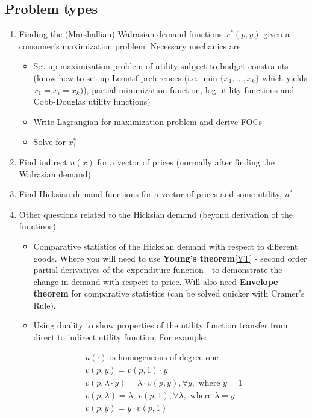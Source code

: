 \documentclass{article}
\begin{document}
\subsection{Problem types}
\begin{enumerate}
    \item Finding the (Marshallian) Walrasian demand functions $x^*(p,y)$ given a consumer's maximization problem. Necessary mechanics are: 
    \begin{itemize}
        \item Set up maximization problem of utility subject to budget constraints (know how to set up Leontif preferences (i.e. $\min \{ x_1, \ldots, x_k \}$ which yields $x_{1} = x_{i} = x_{k}$)), partial minimization function, log utility functions and Cobb-Douglas utility functions)
        \item Write Lagrangian for maximization problem and derive FOCs
        \item Solve for $x_1^*$ 
    \end{itemize}
    \item Find indirect $u(x)$ for a vector of prices (normally after finding the Walrasian demand)
    \item Find Hicksian demand functions for a vector of prices and some utility, $u^*$
    \item Other questions related to the Hicksian demand (beyond derivation of the functions)
    \begin{itemize}
        \item Comparative statistics of the Hicksian demand with respect to different goods. Where you will need to use \textbf{Young's theorem}\ref{YT} - second order partial derivatives of the expenditure function - to demonstrate the change in demand with respect to price. Will also need \textbf{Envelope theorem} for comparative statistics (can be solved quicker with Cramer's Rule). 
        \item Using duality to show properties of the utility function transfer from direct to indirect utility function. For example: 
        \end{itemize}
       
        \[
        \begin{array}{l}
        u(\cdot) \text{ is homogeneous of degree one} \\
        v(p, y) = v(p, 1) \cdot y \\
        v(p, \lambda \cdot y) = \lambda \cdot v(p, y), \forall y, \text{ where } y = 1 \\
        v(p, \lambda) = \lambda \cdot v(p, 1), \forall \lambda, \text{ where } \lambda = y \\
        v(p, y) = y \cdot v(p, 1)
        \end{array}
        \]
    

\end{enumerate}
\end{document}
